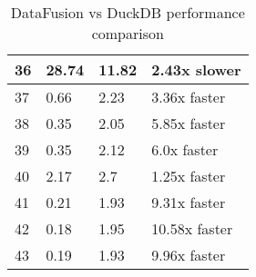 \begin{table}[h]
\begin{tabular}{|l|l|l|l|}
\hline
36 & 28.74 & 11.82 & 2.43x slower \\
\hline
37 & 0.66 & 2.23 & 3.36x faster \\
\hline
38 & 0.35 & 2.05 & 5.85x faster \\
\hline
39 & 0.35 & 2.12 & 6.0x faster \\
\hline
40 & 2.17 & 2.7 & 1.25x faster \\
\hline
41 & 0.21 & 1.93 & 9.31x faster \\
\hline
42 & 0.18 & 1.95 & 10.58x faster \\
\hline
43 & 0.19 & 1.93 & 9.96x faster \\
\hline
\end{tabular}
\caption{DataFusion vs DuckDB performance comparison}
\label{table:1}
\end{table}